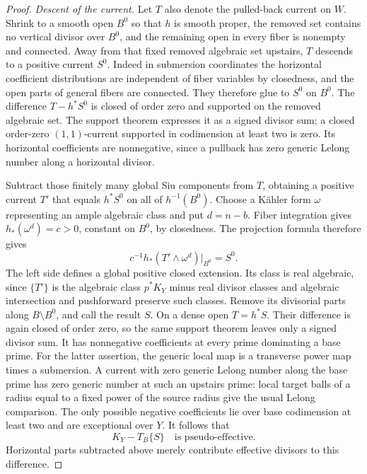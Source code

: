 \documentclass[11pt,letterpaper]{article}
\theoremstyle{definition}
\theoremstyle{remark}
\begin{document}
\begin{proof}
\smallskip
\noindent\emph{Descent of the current.}
Let \(T\) also denote the pulled-back current on \(W\).
Shrink to a smooth open \(B^0\) so that \(h\) is smooth
proper, the removed set contains no vertical divisor
over \(B^0\), and the remaining open in every fiber is
nonempty and connected. Away from that fixed removed
algebraic set upstairs, \(T\) descends to a positive current
\(S^0\).
Indeed in submersion coordinates the horizontal coefficient
distributions are independent of fiber variables by closedness,
and the open parts of general fibers are connected. They
therefore glue to \(S^0\) on \(B^0\). The difference
\(T-h^*S^0\) is closed of order zero and supported on the
removed algebraic set. The support theorem expresses it as a
signed divisor sum; a closed order-zero \((1,1)\)-current
supported in codimension at least two is zero. Its horizontal coefficients are
nonnegative, since a pullback has zero generic Lelong number
along a horizontal divisor.

Subtract those finitely many global Siu components from
\(T\), obtaining a positive current \(T'\) that equals
\(h^*S^0\) on all of \(h^{-1}(B^0)\). Choose a K\"ahler form
\(\omega\) representing an ample algebraic class and put
\(d=n-b\). Fiber integration gives
\(h_*(\omega^d)=c>0\), constant on \(B^0\), by closedness.
The projection formula therefore gives
\[
 c^{-1}h_*(T'\wedge\omega^d)|_{B^0}=S^0.
\]
The left side defines a global positive closed extension.
Its class is real algebraic, since \(\{T'\}\) is the
algebraic class \(p^*K_Y\) minus real divisor classes and
algebraic intersection and pushforward preserve such
classes. Remove its divisorial parts along
\(B\setminus B^0\), and call the result \(S\).
On a dense open \(T=h^*S\). Their difference is again closed
of order zero, so the same support theorem leaves only a
signed divisor sum. It has nonnegative coefficients at every
prime dominating a base prime. For the latter assertion, the
generic local map is a transverse power map times a
submersion. A current with zero generic Lelong number along
the base prime has zero generic number at such an upstairs
prime: local target balls of a radius equal to a fixed power
of the source radius give the usual Lelong comparison.
The only possible negative coefficients lie over base
codimension at least two and are exceptional over \(Y\).
It follows that
\begin{equation}\label{proj:ex:descent-domination}
 K_Y-T_B\{S\}\quad\text{is pseudo-effective}.
\end{equation}
Horizontal parts subtracted above merely contribute effective
divisors to this difference.


\end{proof}
\end{document}
